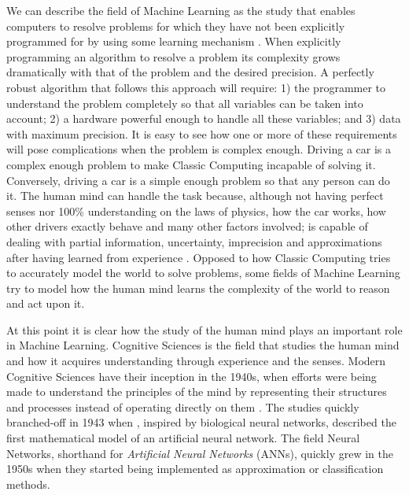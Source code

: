 We can describe the field of Machine Learning as the study that enables computers to resolve problems for which they have not been explicitly programmed for by using some learning mechanism \citet{Samuel1959}.
When explicitly programming an algorithm to resolve a problem its complexity grows dramatically with that of the problem and the desired precision.
A perfectly robust algorithm that follows this approach will require: 1) the programmer to understand the problem completely so that all variables can be taken into account; 2) a hardware powerful enough to handle all these variables; and 3) data with maximum precision.
It is easy to see how one or more of these requirements will pose complications when the problem is complex enough.
Driving a car is a complex enough problem to make Classic Computing incapable of solving it.
Conversely, driving a car is a simple enough problem so that any person can do it.
The human mind can handle the task because, although not having perfect senses nor 100\% understanding on the laws of physics, how the car works, how other drivers exactly behave and many other factors involved; is capable of dealing with partial information, uncertainty, imprecision and approximations after having learned from experience \cite{Zadeh1994}.
Opposed to how Classic Computing tries to accurately model the world to solve problems, some fields of Machine Learning try to model how the human mind learns the complexity of the world to reason and act upon it.

At this point it is clear how the study of the human mind plays an important role in Machine Learning.
Cognitive Sciences is the field that studies the human mind and how it acquires understanding through experience and the senses.
Modern Cognitive Sciences have their inception in the 1940s, when efforts were being made to understand the principles of the mind by representing their structures and processes instead of operating directly on them \cite{Thagard2008}.
The studies quickly branched-off in 1943 when \citet{McCulloch1943}, inspired by biological neural networks, described the first mathematical model of an artificial neural network.
The field Neural Networks, shorthand for \emph{Artificial Neural Networks} (ANNs), quickly grew in the 1950s when they started being implemented \cite{Farley1954,Rosenblatt1958} as approximation or classification methods.

